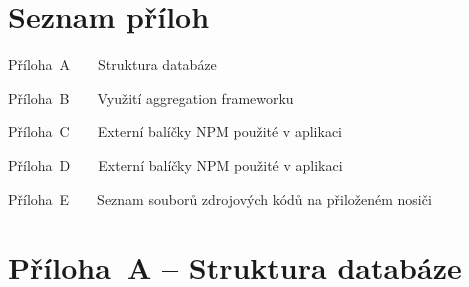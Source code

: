 \documentclass[a4paper,12pt]{article}
\begin{document}


\clearpage {} {}
\section*{Seznam příloh}

\noindent Příloha~A~~~~Struktura databáze \dotfill \pageref{prilohaA}

\noindent Příloha~B~~~~Využití aggregation frameworku \dotfill \pageref{prilohaB}

\noindent Příloha~C~~~~Externí balíčky NPM použité v aplikaci \dotfill \pageref{prilohaC}

\noindent Příloha~D~~~~Externí balíčky NPM použité v aplikaci \dotfill \pageref{prilohaD}

\noindent Příloha~E~~~~Seznam souborů zdrojových kódů na přiloženém nosiči \dotfill \pageref{prilohaE}

\clearpage {}\label{prilohaA} 

\section*{Příloha~A --  Struktura databáze}
\end{document}
